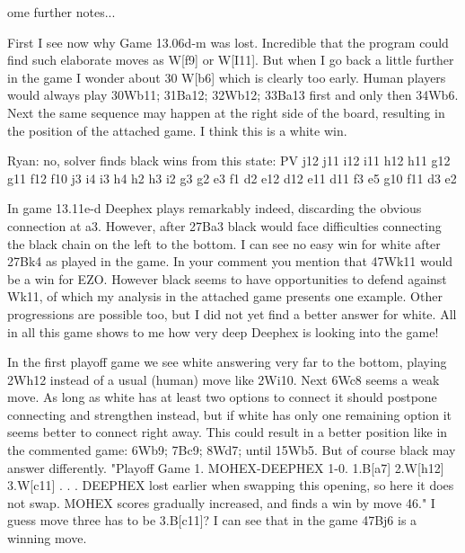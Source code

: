 \documentclass{icga}
\begin{document}
ome further notes...

First I see now why Game 13.06d-m was lost. Incredible that the program could find such elaborate moves as W[f9] or W[I11]. 
But when I go back a little further in the game I wonder about 30 W[b6] which is clearly too early. Human players would always play 30Wb11; 31Ba12; 32Wb12; 33Ba13 first and only then 34Wb6. Next the same sequence may happen at the right side of the board, resulting in the position of the attached game. I think this is a white win. 

Ryan: no, solver finds black wins from this state:
PV j12 j11 i12 i11 h12 h11 g12 g11 f12 f10 j3 i4 i3 h4 h2 h3 i2 g3 g2 e3 f1 d2 e12 d12 e11 d11 f3 e5 g10 f11 d3 e2

In game 13.11e-d Deephex plays remarkably indeed, discarding the obvious connection at a3. However, after 27Ba3 black would face difficulties connecting the black chain on the left to the bottom. I can see no easy win for white after 27Bk4 as played in the game. In your comment you mention that 47Wk11 would be a win for EZO. However black seems to have opportunities to defend against Wk11, of which my analysis in the attached game presents one example. Other progressions are possible too, but I did not yet find a better answer for white. All in all this game shows to me how very deep Deephex is looking into the game! 

In the first playoff game we see white answering very far to the bottom, playing 2Wh12 instead of a usual (human) move like 2Wi10. Next 6Wc8 seems a weak move. As long as white has at least two options to connect it should postpone connecting and strengthen instead, but if white has only one remaining option it seems better to connect right away. This could result in a better position like in the commented game: 6Wb9; 7Bc9; 8Wd7; until 15Wb5. But of course black may answer differently. 
"Playoff Game 1. MOHEX-DEEPHEX 1-0. 1.B[a7] 2.W[h12] 3.W[c11] . . . DEEPHEX lost earlier when swapping
this opening, so here it does not swap. MOHEX scores gradually increased, and finds a win by move 46."
I guess move three has to be 3.B[c11]? 
I can see that in the game 47Bj6 is a winning move. 
\end{document}

